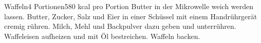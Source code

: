 


\begin{recipe}{Waffeln}{4 Portionen}{580 kcal pro Portion}
Butter in der Mikrowelle weich werden lassen.
Butter, Zucker, Salz und Eier in einer Sch\"ussel mit einem Handr\"uhrger\"at cremig r\"uhren.
Milch, Mehl und Backpulver dazu geben und unterr\"uhren.
Waffeleisen aufheizen und mit \"Ol bestreichen.
Waffeln backen.
\end{recipe}


